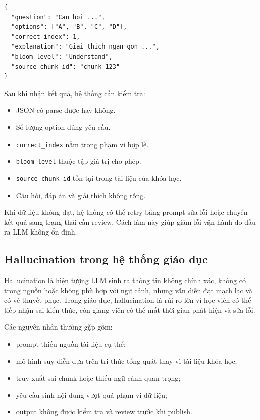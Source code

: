 \begin{lstlisting}[caption={Ví dụ cấu trúc đầu ra cho quiz item}]
{
  "question": "Cau hoi ...",
  "options": ["A", "B", "C", "D"],
  "correct_index": 1,
  "explanation": "Giai thich ngan gon ...",
  "bloom_level": "Understand",
  "source_chunk_id": "chunk-123"
}
\end{lstlisting}

Sau khi nhận kết quả, hệ thống cần kiểm tra:

\begin{itemize}
    \item JSON có parse được hay không.
    \item Số lượng option đúng yêu cầu.
    \item \texttt{correct\_index} nằm trong phạm vi hợp lệ.
    \item \texttt{bloom\_level} thuộc tập giá trị cho phép.
    \item \texttt{source\_chunk\_id} tồn tại trong tài liệu của khóa học.
    \item Câu hỏi, đáp án và giải thích không rỗng.
\end{itemize}

Khi dữ liệu không đạt, hệ thống có thể retry bằng prompt sửa lỗi hoặc chuyển
kết quả sang trạng thái cần review. Cách làm này giúp giảm lỗi vận hành do đầu
ra LLM không ổn định.

\subsection{Hallucination trong hệ thống giáo dục}
\label{subsec:hallucination-giao-duc}

Hallucination là hiện tượng LLM sinh ra thông tin không chính xác, không có
trong nguồn hoặc không phù hợp với ngữ cảnh, nhưng vẫn diễn đạt mạch lạc và có
vẻ thuyết phục. Trong giáo dục, hallucination là rủi ro lớn vì học viên có thể
tiếp nhận sai kiến thức, còn giảng viên có thể mất thời gian phát hiện và sửa
lỗi.

Các nguyên nhân thường gặp gồm:

\begin{itemize}
    \item prompt thiếu nguồn tài liệu cụ thể;
    \item mô hình suy diễn dựa trên tri thức tổng quát thay vì tài liệu khóa
          học;
    \item truy xuất sai chunk hoặc thiếu ngữ cảnh quan trọng;
    \item yêu cầu sinh nội dung vượt quá phạm vi dữ liệu;
    \item output không được kiểm tra và review trước khi publish.
\end{itemize}

